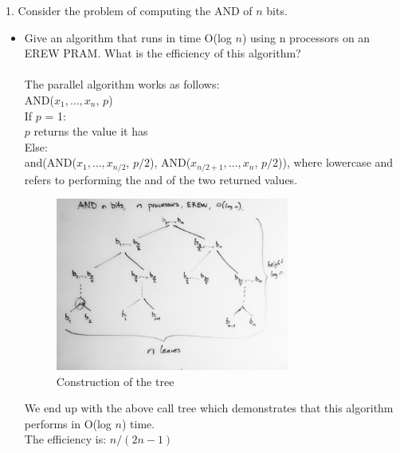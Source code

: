 \documentclass[10pt]{article}
\newcommand{\tab}{\hspace*{2em}}
\begin{document}
	1. Consider the problem of computing the AND of $n$ bits.
	\begin{itemize}
		\item Give an algorithm that runs in time O(log $n$) using n processors on an EREW PRAM. What is
		the efficiency of this algorithm?\\
		\\
		The parallel algorithm works as follows:\\
		AND($x_1, \ldots, x_n$, $p$)\\
		If $p$ = 1:\\
		\tab $p$ returns the value it has\\
		Else:\\
		\tab and(AND($x_1, \ldots, x_{n/2}$, $p/2$), AND($x_{n/2 + 1}, \ldots, x_n$, $p/2$)), where lowercase 
		and refers to performing the and of the two returned values. 
		\begin{figure}[h]
		\centering
		\includegraphics[width=290px]{parallel1.png}
		\caption{Construction of the tree}
		\end{figure}
		
		We end up with the above call tree which demonstrates that this algorithm performs in O(log $n$) time.\\
		The efficiency is: $n / (2n - 1)$
		

\end{itemize}
\end{document}
